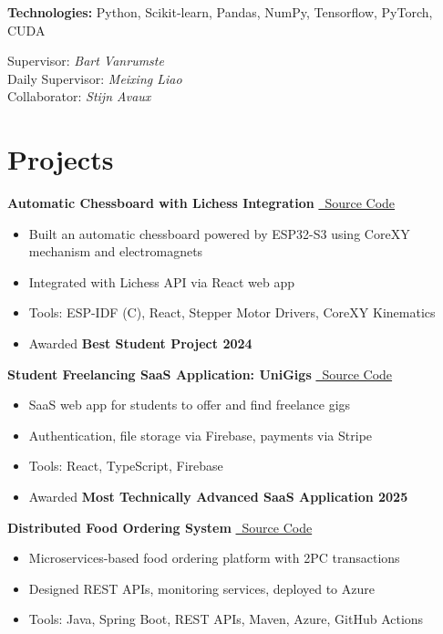 \documentclass[10pt,a4paper]{article}
\newenvironment{highlights}{\begin{itemize}}{\end{itemize}}
\begin{document}
\textbf{Technologies:} Python, Scikit-learn, Pandas, NumPy, Tensorflow, PyTorch, CUDA  

Supervisor: \textit{Bart Vanrumste} \\
Daily Supervisor: \textit{Meixing Liao} \\
Collaborator: \textit{Stijn Avaux}

\section{Projects}
\textbf{Automatic Chessboard with Lichess Integration} \hfill \href{https://github.com/Yornared/ESP32_Chessboard_code}{\faGithub\ Source Code}  
\begin{highlights}
    \item Built an automatic chessboard powered by ESP32-S3 using CoreXY mechanism and electromagnets
    \item Integrated with Lichess API via React web app
    \item Tools: ESP-IDF (C), React, Stepper Motor Drivers, CoreXY Kinematics
    \item Awarded \textbf{Best Student Project 2024}
\end{highlights}

\textbf{Student Freelancing SaaS Application: UniGigs} \hfill \href{https://github.com/Yornared/FreelanceApp}{\faGithub\ Source Code}  
\begin{highlights}
    \item SaaS web app for students to offer and find freelance gigs
    \item Authentication, file storage via Firebase, payments via Stripe
    \item Tools: React, TypeScript, Firebase
    \item Awarded \textbf{Most Technically Advanced SaaS Application 2025}
\end{highlights}

\textbf{Distributed Food Ordering System} \hfill \href{https://github.com/Yornared/Food-ordering-webshop}{\faGithub\ Source Code}  
\begin{highlights}
    \item Microservices-based food ordering platform with 2PC transactions
    \item Designed REST APIs, monitoring services, deployed to Azure
    \item Tools: Java, Spring Boot, REST APIs, Maven, Azure, GitHub Actions
\end{highlights}
\end{document}
